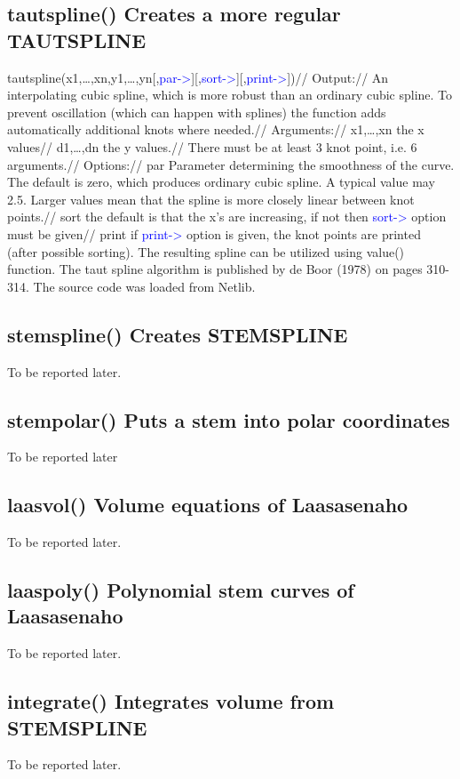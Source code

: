 \subsection{\textcolor{VioletRed}{tautspline}() Creates a more regular TAUTSPLINE}
\label{tautspline}
\textcolor{VioletRed}{tautspline}(x1,…,xn,y1,…,yn[,\textcolor{blue}{par->}][,\textcolor{blue}{sort->}][,\textcolor{blue}{print->}])//
Output://
An interpolating cubic spline, which is more robust than an ordinary cubic spline. To prevent
oscillation (which can happen with splines) the function adds automatically additional knots
where needed.//
Arguments://
x1,…,xn the x values//
d1,…,dn the y values.//
There must be at least 3 knot point, i.e. 6 arguments.//
Options://
par Parameter determining the smoothness of the curve. The default is zero,
which produces ordinary cubic spline. A typical value may 2.5. Larger values mean
that the spline is more closely linear between knot points.//
sort the default is that the x’s are increasing, if not then \textcolor{blue}{sort->} option must be given//
print if \textcolor{blue}{print->} option is given, the knot points are printed (after possible sorting).
The resulting spline can be utilized using \textcolor{VioletRed}{value}() function.
The taut spline algorithm is published by de Boor (1978) on pages 310-314. The source code
was loaded from Netlib.
\subsection{\textcolor{VioletRed}{stemspline}() Creates STEMSPLINE}
\label{stemspline}
To be reported later.
\subsection{\textcolor{VioletRed}{stempolar}() Puts a stem into polar coordinates}
\label{stempolar}
To be reported later
\subsection{\textcolor{VioletRed}{laasvol}() Volume equations of Laasasenaho}
\label{laasvol}
To be reported later.
\subsection{\textcolor{VioletRed}{laaspoly}() Polynomial stem curves of Laasasenaho}
\label{laaspoly}
To be reported later.
\subsection{\textcolor{VioletRed}{integrate}() Integrates volume from STEMSPLINE}
\label{integrate}
To be reported later.
